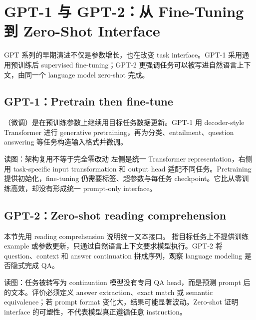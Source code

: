 \section{GPT-1 与 GPT-2：从 Fine-Tuning 到 Zero-Shot Interface}

GPT 系列的早期演进不仅是参数增长，也在改变 task interface。GPT-1 采用通用预训练后 supervised fine-tuning；GPT-2 更强调任务可以被写进自然语言上下文，由同一个 language model zero-shot 完成。

\subsection{GPT-1：Pretrain then fine-tune}

（微调）是在预训练参数上继续用目标任务数据更新。GPT-1 用 decoder-style Transformer 进行 generative pretraining，再为分类、entailment、question answering 等任务构造输入格式并微调。


\begin{knowledgebox}{读图：架构复用不等于完全零改动}
左侧是统一 Transformer representation，右侧用 task-specific input transformation 和 output head 适配不同任务。Pretraining 提供初始化，fine-tuning 仍需要标签、超参数与每任务 checkpoint。它比从零训练高效，却没有形成统一 prompt-only interface。
\end{knowledgebox}

\subsection{GPT-2：Zero-shot reading comprehension}

本节先用 reading comprehension 说明统一文本接口。 指目标任务上不提供训练 example 或参数更新，只通过自然语言上下文要求模型执行。GPT-2 将 question、context 和 answer continuation 拼成序列，观察 language modeling 是否隐式完成 QA。


\begin{knowledgebox}{读图：任务被转写为 continuation}
模型没有专用 QA head，而是预测 prompt 后的文本。评价必须定义 answer extraction、exact match 或 semantic equivalence；若 prompt format 变化大，结果可能显著波动。Zero-shot 证明 interface 的可塑性，不代表模型真正遵循任意 instruction。
\end{knowledgebox}

